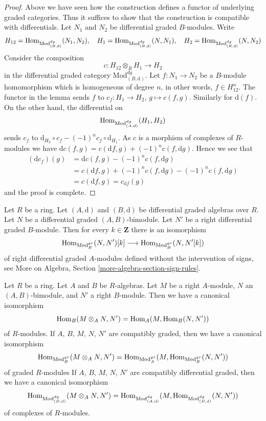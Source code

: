 \begin{proof}
Above we have seen how the construction defines a functor of underlying
graded categories. Thus it suffices to show that the construction is
compatible with differentials. Let $N_1$ and $N_2$ be differential
graded $B$-modules. Write
$$
H_{12} = \mathop{\mathrm{Hom}}\nolimits_{\text{Mod}^{dg}_{(B, \text{d})}}(N_1, N_2),\quad
H_1 = \mathop{\mathrm{Hom}}\nolimits_{\text{Mod}^{dg}_{(B, \text{d})}}(N, N_1),\quad
H_2 = \mathop{\mathrm{Hom}}\nolimits_{\text{Mod}^{dg}_{(B, \text{d})}}(N, N_2)
$$
Consider the composition
$$
c : H_{12} \otimes_R H_1 \longrightarrow H_2
$$
in the differential graded category $\text{Mod}^{dg}_{(B, \text{d})}$.
Let $f : N_1 \to N_2$ be a $B$-module homomorphism which is homogeneous
of degree $n$, in other words, $f \in H_{12}^n$.
The functor in the lemma sends $f$ to $c_f : H_1 \to H_2$, $g \mapsto c(f, g)$.
Similarly for $\text{d}(f)$. On the other hand, the differential on
$$
\mathop{\mathrm{Hom}}\nolimits_{\text{Mod}^{dg}_{(A, \text{d})}}(H_1, H_2)
$$
sends $c_f$ to $\text{d}_{H_2} \circ c_f - (-1)^n c_f \circ \text{d}_{H_1}$.
As $c$ is a morphism of complexes of $R$-modules we have
$\text{d} c(f, g) = c(\text{d}f, g) + (-1)^n c(f, \text{d}g)$.
Hence we see that
\begin{align*}
(\text{d}c_f)(g)
& =
\text{d}c(f,g) - (-1)^n c(f, \text{d}g) \\
& =
c(\text{d}f, g) + (-1)^n c(f, \text{d}g)  - (-1)^n c(f, \text{d}g) \\
& =
c(\text{d}f, g) = c_{\text{d}f}(g)
\end{align*}
and the proof is complete.
\end{proof}

\begin{remark}
\label{remark-shift-hom-no-sign}
Let $R$ be a ring. Let $(A, \text{d})$ and $(B, \text{d})$
be differential graded algebras over $R$. Let $N$ be a
differential graded $(A, B)$-bimodule. Let $N'$ be a right differential
graded $B$-module. Then for every $k \in \mathbf{Z}$ there
is an isomorphism
$$
\mathop{\mathrm{Hom}}\nolimits_{\text{Mod}^{gr}_B}(N, N')[k]
\longrightarrow
\mathop{\mathrm{Hom}}\nolimits_{\text{Mod}^{gr}_B}(N, N'[k])
$$
of right differential graded $A$-modules defined without the intervention
of signs, see More on Algebra, Section \ref{more-algebra-section-sign-rules}.
\end{remark}

\begin{lemma}
\label{lemma-tensor-hom-adjunction}
Let $R$ be a ring. Let $A$ and $B$ be $R$-algebras.
Let $M$ be a right $A$-module, $N$ an $(A, B)$-bimodule, and
$N'$ a right $B$-module. Then we have a canonical isomorphism
$$
\mathop{\mathrm{Hom}}\nolimits_B(M \otimes_A N, N') = \mathop{\mathrm{Hom}}\nolimits_A(M, \mathop{\mathrm{Hom}}\nolimits_B(N, N'))
$$
of $R$-modules.
If $A$, $B$, $M$, $N$, $N'$ are compatibly graded, then we have a
canonical isomorphism
$$
\mathop{\mathrm{Hom}}\nolimits_{\text{Mod}_B^{gr}}(M \otimes_A N, N') =
\mathop{\mathrm{Hom}}\nolimits_{\text{Mod}_A^{gr}}(M, \mathop{\mathrm{Hom}}\nolimits_{\text{Mod}_B^{gr}}(N, N'))
$$
of graded $R$-modules
If $A$, $B$, $M$, $N$, $N'$ are compatibly differential graded, then
we have a canonical isomorphism
$$
\mathop{\mathrm{Hom}}\nolimits_{\text{Mod}^{dg}_{(B, \text{d})}}(M \otimes_A N, N') =
\mathop{\mathrm{Hom}}\nolimits_{\text{Mod}^{dg}_{(A, \text{d})}}(M,
\mathop{\mathrm{Hom}}\nolimits_{\text{Mod}^{dg}_{(B, \text{d})}}(N, N'))
$$
of complexes of $R$-modules.
\end{lemma}

